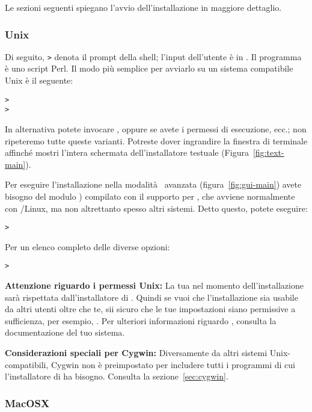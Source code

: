 \documentclass{article}
\begin{document}
\noindent
Le sezioni seguenti spiegano l'avvio dell'installazione in maggiore
dettaglio.

\subsubsection{Unix}

Di seguito, \texttt{>} denota il prompt della shell; l'input dell'utente è
in .
Il programma  è uno script Perl. Il modo più semplice
per avviarlo su un sistema compatibile Unix è il seguente:
\begin{alltt}
> 
> 
\end{alltt}
In alternativa potete invocare
, oppure
 se avete i permessi di esecuzione, ecc.; non ripeteremo
tutte queste varianti. Potreste dover ingrandire la finestra di terminale
affinché mostri l'intera schermata dell'installatore testuale
(Figura~\ref{fig:text-main}).

Per eseguire l'installazione nella modalità \GUI\ avanzata
(figura~\ref{fig:gui-main}) avete bisogno del modulo )
compilato con il supporto per , che avviene normalmente con
\GNU/Linux, ma non altrettanto spesso altri sistemi. Detto questo, potete
eseguire:
\begin{alltt}
> 
\end{alltt}

Per un elenco completo delle diverse opzioni:
\begin{alltt}
> 
\end{alltt}

\textbf{Attenzione riguardo i permessi Unix:} La tua  nel
momento dell'installazione sarà rispettata dall'installatore di \TL{}.
Quindi se vuoi che l'installazione sia usabile da altri utenti oltre che
te, sii sicuro che le tue impostazioni siano permissive a sufficienza, per
esempio, . Per ulteriori informazioni riguardo
, consulta la documentazione del tuo sistema.

\textbf{Considerazioni speciali per Cygwin:} Diversamente da altri sistemi
Unix-compatibili, Cygwin non è preimpostato per includere tutti i
programmi di cui l'installatore di \TL{} ha bisogno. Consulta la
sezione~\ref{sec:cygwin}.


\subsubsection{MacOSX}
\end{document}
